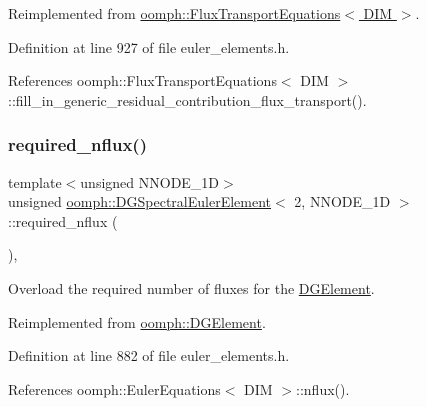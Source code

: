 Reimplemented from \hyperlink{classoomph_1_1FluxTransportEquations_a6994eab818eb7236e24e45b6fedec1f7}{oomph\+::\+Flux\+Transport\+Equations$<$ D\+I\+M $>$}.



Definition at line 927 of file euler\+\_\+elements.\+h.



References oomph\+::\+Flux\+Transport\+Equations$<$ D\+I\+M $>$\+::fill\+\_\+in\+\_\+generic\+\_\+residual\+\_\+contribution\+\_\+flux\+\_\+transport().

\mbox{\label{classoomph_1_1DGSpectralEulerElement_3_012_00_01NNODE__1D_01_4_a070767446172be36e3abd6faa624d71d}} 
\subsubsection{\texorpdfstring{required\+\_\+nflux()}{required\_nflux()}}
{\footnotesize\ttfamily template$<$unsigned N\+N\+O\+D\+E\+\_\+1D$>$ \\
unsigned \hyperlink{classoomph_1_1DGSpectralEulerElement}{oomph\+::\+D\+G\+Spectral\+Euler\+Element}$<$ 2, N\+N\+O\+D\+E\+\_\+1D $>$\+::required\+\_\+nflux (\begin{DoxyParamCaption}{ }\end{DoxyParamCaption})\hspace{0.3cm}{\ttfamily [inline]}, {\ttfamily [virtual]}}



Overload the required number of fluxes for the \hyperlink{classoomph_1_1DGElement}{D\+G\+Element}. 



Reimplemented from \hyperlink{classoomph_1_1DGElement_a87dc9f5b40437c3ab22db35229012c07}{oomph\+::\+D\+G\+Element}.



Definition at line 882 of file euler\+\_\+elements.\+h.



References oomph\+::\+Euler\+Equations$<$ D\+I\+M $>$\+::nflux().



